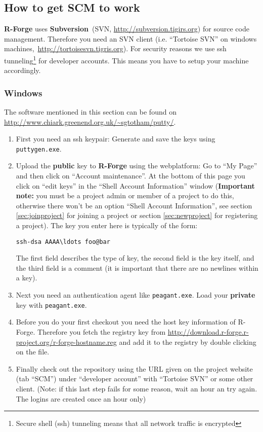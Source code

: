 \documentclass[a4paper]{article}
\begin{document}
\subsection{How to get SCM to work}
\label{sec:scmhowto}

\textbf{R-Forge} uses
\textbf{Subversion}~(SVN, \url{http://subversion.tigirs.org}) for
source code management.
Therefore you need an SVN client (i.e. ``Tortoise SVN'' on
windows machines,~\url{http://tortoisesvn.tigris.org}). For security
reasons we use ssh tunneling\footnote{Secure shell (ssh) tunneling
  means that all network traffic is encrypted} for
developer accounts. This means you have to setup your machine
accordingly.

\subsubsection{Windows}

The software mentioned in this section can be found
on\newline
\url{http://www.chiark.greenend.org.uk/~sgtotham/putty/}.
\begin{enumerate}
\item First you need an ssh keypair: Generate and save the keys
  using \texttt{puttygen.exe}.   
\item Upload the \textbf{public} key to \textbf{R-Forge} using the webplatform: Go to
  ``My Page'' and then click on ``Account maintenance''. At the bottom
  of this page you click on ``edit keys'' in the ``Shell Account
  Information'' window (\textbf{Important note:} you must be a project admin
  or member of a project to do this, otherwise there won't be an
  option ``Shell Account Information'', see section
  \ref{sec:joinproject} for joining a project or section
  \ref{sec:newproject} for registering a project).
  The key you enter here is typically of the form:
\begin{verbatim}
ssh-dsa AAAA\ldots foo@bar
\end{verbatim}
  The first field
  describes the type of key, the second field is the key itself, and
  the third field is a comment (it is important that there are no
  newlines within a key).
\item Next you need an authentication agent like \texttt{peagant.exe}. Load
  your \textbf{private} key with \texttt{peagant.exe}.
\item Before you do your first checkout you need the host
  key information of R-Forge. Therefore you fetch the registry key
  from
  \url{http://download.r-forge.r-project.org/r-forge-hostname.reg} and
  add it to the registry by double clicking on the file.
\item Finally check out the repository using the URL given on the
  project website (tab ``SCM'') under ``developer account'' with
  ``Tortoise SVN'' or some other client. (Note: if this last step
  fails for some reason, wait an hour an try again. The logins are
  created once an hour only)
\end{enumerate}
\end{document}
